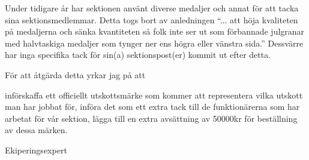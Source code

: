 \documentclass[../_main/handlingar.tex]{subfiles}
\begin{document}

Under tidigare år har sektionen använt diverse medaljer och annat för att tacka sina sektionsmedlemmar. Detta togs bort av anledningen ``... att höja kvaliteten på medaljerna och sänka kvantiteten så folk inte ser ut som förbannade julgranar med halvtaskiga medaljer som tynger ner ens högra eller vänstra sida.'' Dessvärre har inga specifika tack för sin(a) sektionspost(er) kommit ut efter detta.

För att åtgärda detta yrkar jag på att
\begin{attsatser}
	\att införskaffa ett officiellt utskottsmärke som kommer att representera vilka utskott man har jobbat för,
	\att införa det som ett extra tack till de funktionärerna som har arbetat för vår sektion,
	\att lägga till en extra avsättning av 50000kr för beställning av dessa märken.
\end{attsatser}

\begin{signatures}{1}
	\mvh
	\signature{Henrik Ramström}{Ekiperingsexpert}
\end{signatures}
\end{document}
